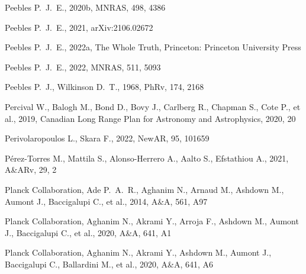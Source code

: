 \documentclass[fleqn,usenatbib]{mnras}
\begin{document}
\begin{thebibliography}{}
 Peebles P.~J.~E., 2020b, MNRAS, 498, 4386

 Peebles P.~J.~E., 2021, arXiv:2106.02672

 Peebles P.~J.~E., 2022a, The Whole Truth, Princeton: Princeton University Press

 Peebles P.~J.~E., 2022, MNRAS, 511, 5093

 Peebles P.~J., Wilkinson D.~T., 1968, PhRv, 174, 2168

 Percival W., Balogh M., Bond D., Bovy J., Carlberg R., Chapman S., Cote P., et al., 2019,  
Canadian Long Range Plan for Astronomy and Astrophysics, 2020, 20

 Perivolaropoulos L., Skara F., 2022, NewAR, 95, 101659


 P{\'e}rez-Torres M., Mattila S., Alonso-Herrero A., Aalto S., Efstathiou A., 2021, A\&ARv, 29, 2


 Planck Collaboration, Ade P.~A.~R., Aghanim N., Arnaud M., Ashdown M., Aumont J., Baccigalupi C., et al., 2014, A\&A, 561, A97

 Planck Collaboration, Aghanim N., Akrami Y., Arroja F., Ashdown M., Aumont J., Baccigalupi C., et al., 2020, A\&A, 641, A1

 Planck Collaboration, Aghanim N., Akrami Y., Ashdown M., Aumont J., Baccigalupi C., Ballardini M., et al., 2020, A\&A, 641, A6


\end{thebibliography}
\end{document}
